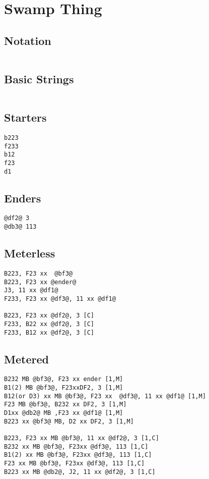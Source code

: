 \documentclass[main.tex MB]{subfiles}
\begin{document}
\chapter{Swamp Thing}

\section{Notation}
\begin{lstlisting}[language=FG]
\end{lstlisting}


\section{Basic Strings}

\begin{lstlisting}[language=FG]
\end{lstlisting}

\section{Starters}
\begin{lstlisting}[language=FG]
b223
f233
b12
f23
d1
\end{lstlisting}

\section{Enders}

\begin{lstlisting}[language=FG]
@df2@ 3
@db3@ 113
\end{lstlisting}

\section{Meterless}


\begin{lstlisting}[language=FG]
B223, F23 xx  @bf3@
B223, F23 xx @ender@
J3, 11 xx @df1@
F233, F23 xx @df3@, 11 xx @df1@

B223, F23 xx @df2@, 3 [C]
F233, B22 xx @df2@, 3 [C]
F233, B12 xx @df2@, 3 [C]
\end{lstlisting}

\section{Metered}


\begin{lstlisting}[language=FG]
B232 MB @bf3@, F23 xx ender [1,M]
B1(2) MB @bf3@, F23xxDF2, 3 [1,M]
B12(or D3) xx MB @bf3@, F23 xx  @df3@, 11 xx @df1@ [1,M]
F23 MB @bf3@, B232 xx DF2, 3 [1,M]
D1xx @db2@ MB ,F23 xx @df1@ [1,M]
B223 xx @bf3@ MB, D2 xx DF2, 3 [1,M]

B223, F23 xx MB @bf3@, 11 xx @df2@, 3 [1,C]
B232 xx MB @bf3@, F23xx @df3@, 113 [1,C]
B1(2) xx MB @bf3@, F23xx @df3@, 113 [1,C]
F23 xx MB @bf3@, F23xx @df3@, 113 [1,C]
B223 xx MB @db2@, J2, 11 xx @df2@, 3 [1,C]
\end{lstlisting}
\end{document}
